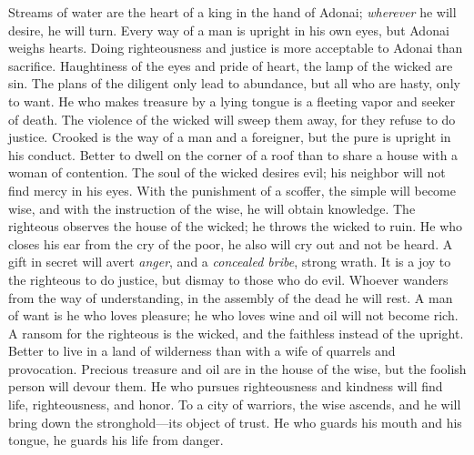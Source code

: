 \begin{biblechapter} %
\verse Streams of water are the heart of a king in the hand of Adonai; 
\textit{wherever} he will desire, he will turn.
\verse Every way of a man is upright in his own eyes, 
but Adonai weighs hearts.
\verse Doing righteousness and justice is more acceptable 
to Adonai than sacrifice.
\verse Haughtiness of the eyes and pride of heart, 
the lamp of the wicked are sin.
\verse The plans of the diligent only lead to abundance, 
but all who are hasty, only to want.
\verse He who makes treasure by a lying tongue 
is a fleeting vapor and seeker of death.
\verse The violence of the wicked will sweep them away, 
for they refuse to do justice.
\verse Crooked is the way of a man and a foreigner, 
but the pure is upright in his conduct.
\verse Better to dwell on the corner of a roof 
than to share a house with a woman of contention.
\verse The soul of the wicked desires evil; 
his neighbor will not find mercy in his eyes.
\verse With the punishment of a scoffer, the simple will become wise, 
and with the instruction of the wise, he will obtain knowledge.
\verse The righteous observes the house of the wicked; 
he throws the wicked to ruin.
\verse He who closes his ear from the cry of the poor, 
he also will cry out and not be heard.
\verse A gift in secret will avert \textit{anger}, 
and a \textit{concealed bribe}, strong wrath.
\verse It is a joy to the righteous to do justice, 
but dismay to those who do evil.
\verse Whoever wanders from the way of understanding, 
in the assembly of the dead he will rest.
\verse A man of want is he who loves pleasure; 
he who loves wine and oil will not become rich.
\verse A ransom for the righteous is the wicked, 
and the faithless instead of the upright.
\verse Better to live in a land of wilderness 
than with a wife of quarrels and provocation.
\verse Precious treasure and oil are in the house of the wise, 
but the foolish person will devour them.
\verse He who pursues righteousness and kindness 
will find life, righteousness, and honor.
\verse To a city of warriors, the wise ascends, 
and he will bring down the stronghold—its object of trust.
\verse He who guards his mouth and his tongue, 
he guards his life from danger.

\end{biblechapter}
